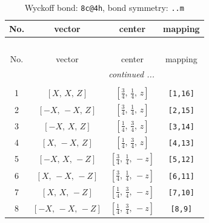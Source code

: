 \documentclass[fleqn,8pt]{jsarticle}
\begin{document}
\renewcommand{\arraystretch}{1.2}
\begin{longtable}{cccc}
\caption{Wyckoff bond: {\tt 8c@4h}, bond symmetry: {\tt ..m}}
 \\
 \hline \hline
No. & vector & center & mapping \\ \hline \endfirsthead

\multicolumn{3}{l}{\tablename\ \thetable{}} \\
 \hline \hline
No. & vector & center & mapping \\ \hline \endhead

 \hline \hline
\multicolumn{3}{r}{\footnotesize\it continued ...} \\ \endfoot

 \hline \hline
\multicolumn{3}{r}{} \\ \endlastfoot

1 & $\left[ X,\, X,\, Z \right]$ & $\left[ \frac{3}{4},\, \frac{1}{4},\, z \right]$ & {\tt [1,16]} \\ \hline
2 & $\left[ - X,\, - X,\, Z \right]$ & $\left[ \frac{3}{4},\, \frac{1}{4},\, z \right]$ & {\tt [2,15]} \\ \hline
3 & $\left[ - X,\, X,\, Z \right]$ & $\left[ \frac{1}{4},\, \frac{3}{4},\, z \right]$ & {\tt [3,14]} \\ \hline
4 & $\left[ X,\, - X,\, Z \right]$ & $\left[ \frac{1}{4},\, \frac{3}{4},\, z \right]$ & {\tt [4,13]} \\ \hline
5 & $\left[ - X,\, X,\, - Z \right]$ & $\left[ \frac{3}{4},\, \frac{1}{4},\, - z \right]$ & {\tt [5,12]} \\ \hline
6 & $\left[ X,\, - X,\, - Z \right]$ & $\left[ \frac{3}{4},\, \frac{1}{4},\, - z \right]$ & {\tt [6,11]} \\ \hline
7 & $\left[ X,\, X,\, - Z \right]$ & $\left[ \frac{1}{4},\, \frac{3}{4},\, - z \right]$ & {\tt [7,10]} \\ \hline
8 & $\left[ - X,\, - X,\, - Z \right]$ & $\left[ \frac{1}{4},\, \frac{3}{4},\, - z \right]$ & {\tt [8,9]} \\
\end{longtable}
\renewcommand{\arraystretch}{1.2}
\end{document}
